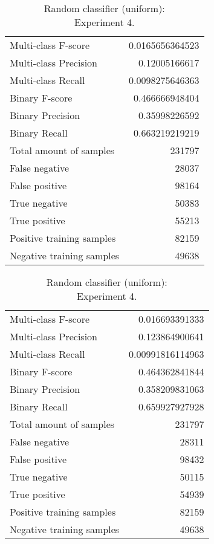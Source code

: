 \begin{table}[H]
\begin{minipage}{0.5\textwidth}
\caption{Random classifier (uniform): \\Experiment 3.}
\centering
\begin{tabular}{l r}
\toprule
Multi-class F-score & 0.0165656364523 \\
Multi-class Precision & 0.12005166617 \\
Multi-class Recall & 0.0098275646363 \\
\midrule
Binary F-score & 0.466666948404 \\
Binary Precision & 0.35998226592 \\
Binary Recall & 0.663219219219 \\
\midrule
Total amount of samples & 231797 \\
False negative & 28037 \\
False positive & 98164 \\
True negative & 50383 \\
True positive & 55213 \\
\midrule
Positive training samples & 82159 \\
Negative training samples & 49638 \\
\bottomrule
\end{tabular}
\end{minipage}
\hfillx
\begin{minipage}{0.5\textwidth}
\caption{Random classifier (uniform): \\Experiment 4.}
\centering
\begin{tabular}{l r}
\toprule
Multi-class F-score & 0.016693391333 \\
Multi-class Precision & 0.123864900641 \\
Multi-class Recall & 0.00991816114963 \\
\midrule
Binary F-score & 0.464362841844 \\
Binary Precision & 0.358209831063 \\
Binary Recall & 0.659927927928 \\
\midrule
Total amount of samples & 231797 \\
False negative & 28311 \\
False positive & 98432 \\
True negative & 50115 \\
True positive & 54939 \\
\midrule
Positive training samples & 82159 \\
Negative training samples & 49638 \\
\bottomrule
\end{tabular}
\end{minipage}
\end{table}
